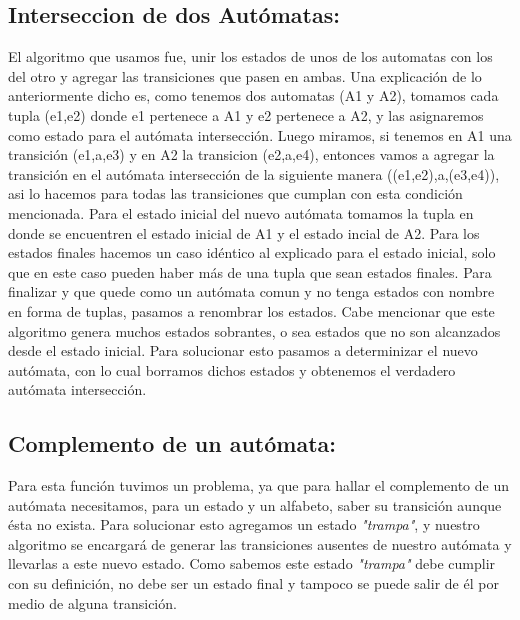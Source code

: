 \subsection{Interseccion de dos Autómatas:}
El algoritmo que usamos fue, unir los estados de unos de los automatas con los del otro y agregar las transiciones que pasen en ambas.\newline
Una explicación de lo anteriormente dicho es, como tenemos dos automatas (A1 y A2), tomamos cada tupla (e1,e2) donde e1 pertenece a A1 y e2 pertenece a A2, y las asignaremos como estado para el autómata intersección. Luego miramos, si tenemos en A1 una transición (e1,a,e3) y en A2 la transicion (e2,a,e4), entonces vamos a agregar la transición en el autómata intersección de la siguiente manera ((e1,e2),a,(e3,e4)), asi lo hacemos para todas las transiciones que cumplan con esta condición mencionada.\newline
Para el estado inicial del nuevo autómata tomamos la tupla en donde se encuentren el estado inicial de A1 y el estado incial de A2. Para los estados finales hacemos un caso idéntico al explicado para el estado inicial, solo que en este caso pueden haber más de una tupla que sean estados finales.\newline
Para finalizar y que quede como un autómata comun y no tenga estados con nombre en forma de tuplas, pasamos a renombrar los estados.\newline
Cabe mencionar que este algoritmo genera muchos estados sobrantes, o sea estados que no son alcanzados desde el estado inicial. Para solucionar esto pasamos a determinizar el nuevo autómata, con lo cual borramos dichos estados y obtenemos el verdadero autómata intersección.

\subsection{Complemento de un autómata:}
Para esta función tuvimos un problema, ya que para hallar el complemento de un autómata necesitamos, para un estado y un alfabeto, saber su transición aunque ésta no exista. Para solucionar esto agregamos un estado \textit{"trampa"}, y nuestro algoritmo se encargará de generar las transiciones ausentes de nuestro autómata y llevarlas a este nuevo estado. Como sabemos este estado \textit{"trampa"} debe cumplir con su definición, no debe ser un estado final y tampoco se puede salir de él por medio de alguna transición. 

